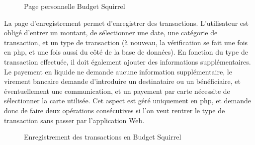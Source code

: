 \documentclass[a4paper,12pt]{article}
\begin{document}
\begin{figure}[!ht]
\noindent
{}
\caption{\footnotesize{Page personnelle Budget Squirrel}}
\end{figure}

La page d'enregistrement permet d'enregistrer des transactions. L'utilisateur est obligé d'entrer un montant, de sélectionner une date, une catégorie de transaction, et un type de transaction (à nouveau, la vérification se fait une fois en php, et une fois aussi du côté de la base de données). En fonction du type de transaction effectuée, il doit également ajouter des informations supplémentaires. Le payement en liquide ne demande aucune information supplémentaire, le virement bancaire demande d'introduire un destinataire ou un bénéficiaire, et éventuellement une communication, et un payement par carte nécessite de sélectionner la carte utilisée. Cet aspect est géré uniquement en php, et demande donc de faire deux opérations consécutives si l'on veut rentrer le type de transaction sans passer par l'application Web.

\begin{figure}[!ht]
\noindent
{}
\caption{\footnotesize{Enregistrement des transactions en Budget Squirrel}}
\end{figure}
\end{document}
